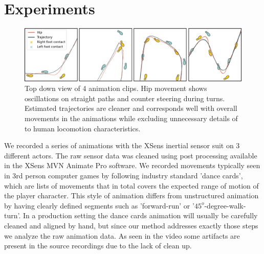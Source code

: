 \section{Experiments}

\begin{figure}
    \centering
    \includegraphics[width=1.0\columnwidth]{img/estimated_trajectory_examples_small.png}
    \caption{Top down view of 4 animation clips. Hip movement shows oscillations on straight paths and counter steering during turns. Estimated trajectories are cleaner and corresponds well with overall movements in the animations while excluding unnecessary details of to human locomotion characteristics.}
    \label{fig:results:estimatedtrajectory:examples}
\end{figure}
We recorded a series of animations with the XSens inertial sensor suit on 3 different actors. The raw sensor data was cleaned using post processing available in the XSens MVN Animate Pro software. We recorded movements typically seen in 3rd person computer games by following industry standard 'dance cards', which are lists of movements that in total covers the expected range of motion of the player character. This style of animation differs from unstructured animation by having clearly defined segments such as 'forward-run' or '$45^o$-degree-walk-turn'. In a production setting the dance cards animation will usually be carefully cleaned and aligned by hand, but since our method addresses exactly those steps we analyze the raw animation data. As seen in the video some artifacts are present in the source recordings due to the lack of clean up.

